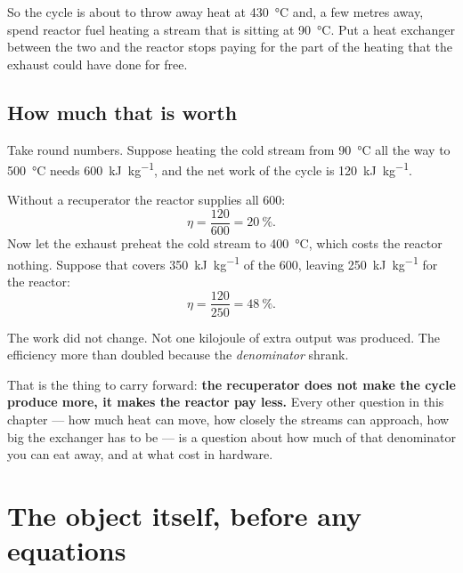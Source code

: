 \documentclass[11pt,a4paper]{report}
\begin{document}
So the cycle is about to throw away heat at \SI{430}{\celsius} and, a few
metres away, spend reactor fuel heating a stream that is sitting at
\SI{90}{\celsius}. Put a heat exchanger between the two and the reactor
stops paying for the part of the heating that the exhaust could have done
for free.

\subsection{How much that is worth}

Take round numbers. Suppose heating the cold stream from \SI{90}{\celsius}
all the way to \SI{500}{\celsius} needs \SI{600}{\kilo\joule\per\kilogram},
and the net work of the cycle is \SI{120}{\kilo\joule\per\kilogram}.

Without a recuperator the reactor supplies all \SI{600}{}:
\[
  \eta = \frac{120}{600} = \SI{20}{\percent}.
\]
Now let the exhaust preheat the cold stream to \SI{400}{\celsius}, which
costs the reactor nothing. Suppose that covers
\SI{350}{\kilo\joule\per\kilogram} of the \SI{600}{}, leaving
\SI{250}{\kilo\joule\per\kilogram} for the reactor:
\[
  \eta = \frac{120}{250} = \SI{48}{\percent}.
\]

The work did not change. Not one kilojoule of extra output was produced. The
efficiency more than doubled because the \emph{denominator} shrank.

That is the thing to carry forward: \textbf{the recuperator does not make
the cycle produce more, it makes the reactor pay less.} Every other question
in this chapter --- how much heat can move, how closely the streams can
approach, how big the exchanger has to be --- is a question about how much
of that denominator you can eat away, and at what cost in hardware.

\section{The object itself, before any equations}
\end{document}
